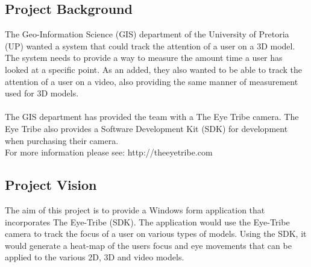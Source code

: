 \subsection{Project Background}
The Geo-Information Science (GIS) department of the University of Pretoria (UP) wanted a system that could track the attention of a user on a 3D model. The system needs to provide a way to measure the amount time a user has looked at a specific point. As an added, they also wanted to be able to track the attention of a user on a video, also providing the same manner of measurement used for 3D models.\\
\\
The GIS department has provided the team with a The Eye Tribe camera. The Eye Tribe also provides a Software Development Kit (SDK) for development when purchasing their camera.\\
For more information please see: http://theeyetribe.com

\subsection{Project Vision}
The aim of this project is to provide a Windows form application that incorporates The Eye-Tribe (SDK). The application would use the Eye-Tribe camera to track the focus of a user on various types of  models. Using the SDK, it would generate a heat-map of the users focus and eye movements that can be applied to the various 2D, 3D and video models.
